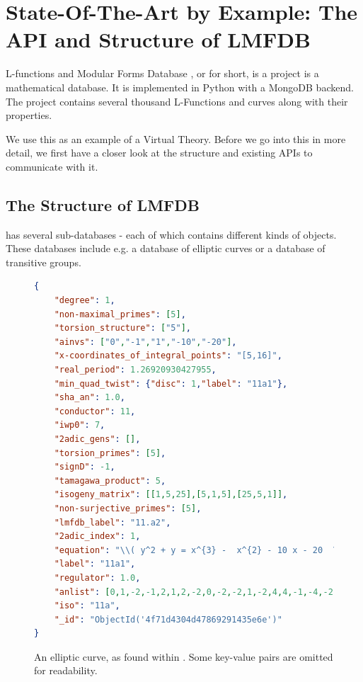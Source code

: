\section{State-Of-The-Art by Example: The API and Structure of LMFDB}\label{sec:sota}

L-functions and Modular Forms Database \cite{lmfdb}, or \lmfdb for short, is a project is a mathematical database. 
It is implemented in Python with a MongoDB backend. 
The project contains several thousand L-Functions and curves along with their properties. 

We use this as an example of a Virtual Theory. 
Before we go into this in more detail, we first have a closer look at the structure and existing APIs to communicate with it. 

\subsection{The Structure of LMFDB}\label{sec:sota:struct}

\lmfdb has several sub-databases - each of which contains different kinds of objects. 
These databases include e.g. a database of elliptic curves or a database of transitive groups. 

\begin{figure}[h]
  \begin{center}
      \begin{lstlisting}[language=json]
{
    "degree": 1,
    "non-maximal_primes": [5],
    "torsion_structure": ["5"],
    "ainvs": ["0","-1","1","-10","-20"],
    "x-coordinates_of_integral_points": "[5,16]",
    "real_period": 1.26920930427955,
    "min_quad_twist": {"disc": 1,"label": "11a1"},
    "sha_an": 1.0,
    "conductor": 11,
    "iwp0": 7,
    "2adic_gens": [],
    "torsion_primes": [5],
    "signD": -1,
    "tamagawa_product": 5,
    "isogeny_matrix": [[1,5,25],[5,1,5],[25,5,1]],
    "non-surjective_primes": [5],
    "lmfdb_label": "11.a2",
    "2adic_index": 1,
    "equation": "\\( y^2 + y = x^{3} -  x^{2} - 10 x - 20  \\)",
    "label": "11a1",
    "regulator": 1.0,
    "anlist": [0,1,-2,-1,2,1,2,-2,0,-2,-2,1,-2,4,4,-1,-4,-2,4,0,2],
    "iso": "11a",
    "_id": "ObjectId('4f71d4304d47869291435e6e')"
}
      \end{lstlisting}
  \end{center}
  
  \vspace*{-1.5em}
  

  \caption[An elliptic curve within lmfdb]{
    An elliptic curve, as found within \lmfdb. 
    Some key-value pairs are omitted for readability. 
  }
  \label{fig:lmfdbexample}
\end{figure}


